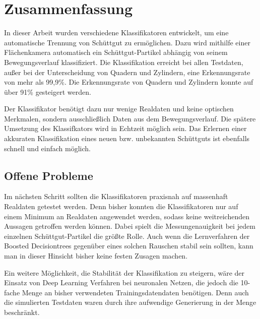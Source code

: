 \section{Zusammenfassung}
In dieser Arbeit wurden verschiedene Klassifikatoren entwickelt, um eine automatische Trennung von Schüttgut zu ermöglichen. Dazu wird mithilfe einer Flächenkamera automatisch ein Schüttgut-Partikel abhängig von seinem Bewegungsverlauf klassifiziert. Die Klassifikation erreicht bei allen Testdaten, außer bei der Unterscheidung von Quadern und Zylindern, eine Erkennungsrate von mehr als 99,9\%. Die Erkennungsrate von Quadern und Zylindern konnte auf über 91\% gesteigert werden. 

Der Klassifikator benötigt dazu nur wenige Realdaten und keine optischen Merkmalen, sondern ausschließlich Daten aus dem Bewegungsverlauf. Die spätere Umsetzung des Klassifkators wird in Echtzeit möglich sein. Das Erlernen einer akkuraten Klassifikation eines neuen bzw. unbekannten Schüttguts ist ebenfalls schnell und einfach möglich. 

\subsection{Offene Probleme}
Im nächsten Schritt sollten die Klassifikatoren praxisnah auf massenhaft Realdaten getestet werden. Denn bisher konnten die Klassifikatoren nur auf einem Minimum an Realdaten angewendet werden, sodass keine weitreichenden Aussagen getroffen werden können. Dabei spielt die Messungenauigkeit bei jedem einzelnen Schüttgut-Partikel die größte Rolle. Auch wenn die Lernverfahren der Boosted Decisiontrees gegenüber eines solchen Rauschen stabil sein sollten, kann man in dieser Hinsicht  bisher keine festen Zusagen machen. 

Ein weitere Möglichkeit, die Stabilität der Klassifikation zu steigern, wäre der Einsatz von Deep Learning Verfahren bei neuronalen Netzen, die jedoch die 10-fache Menge an bisher verwendeten Trainingsdatendaten benötigen. Denn auch die simulierten Testdaten waren durch ihre aufwendige Generierung in der Menge beschränkt.  
